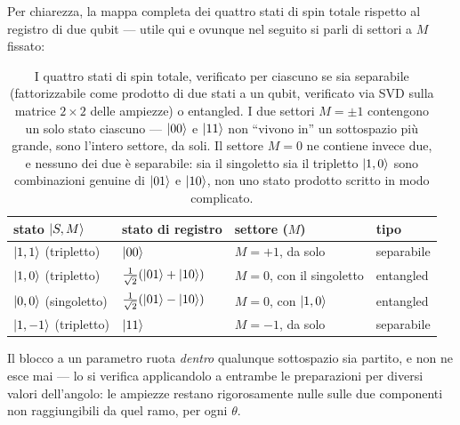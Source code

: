 \documentclass[11pt,a4paper]{article}
\begin{document}
Per chiarezza, la mappa completa dei quattro stati di spin totale rispetto
al registro di due qubit --- utile qui e ovunque nel seguito si parli di
settori a $M$ fissato:

\begin{table}[htbp]
\centering
\small
\renewcommand{\arraystretch}{1.3}
\begin{tabular}{@{}llll@{}}
\toprule
\rowcolor{grigetto}
\textbf{stato $\lvert S,M\rangle$} & \textbf{stato di registro} & \textbf{settore ($M$)} & \textbf{tipo} \\
\midrule
$\lvert 1,1\rangle$ (tripletto) & $\lvert 00\rangle$ & $M=+1$, da solo & separabile \\
$\lvert 1,0\rangle$ (tripletto) & $\tfrac{1}{\sqrt2}(\lvert 01\rangle+\lvert 10\rangle)$ & $M=0$, con il singoletto & entangled \\
$\lvert 0,0\rangle$ (singoletto) & $\tfrac{1}{\sqrt2}(\lvert 01\rangle-\lvert 10\rangle)$ & $M=0$, con $\lvert 1,0\rangle$ & entangled \\
$\lvert 1,-1\rangle$ (tripletto) & $\lvert 11\rangle$ & $M=-1$, da solo & separabile \\
\bottomrule
\end{tabular}
\caption{I quattro stati di spin totale, verificato per ciascuno se sia
separabile (fattorizzabile come prodotto di due stati a un qubit,
verificato via SVD sulla matrice $2\times2$ delle ampiezze) o entangled. I
due settori $M=\pm1$ contengono un solo stato ciascuno --- $\lvert 00\rangle$ e
$\lvert 11\rangle$ non ``vivono in'' un sottospazio più grande, sono l'intero
settore, da soli. Il settore $M=0$ ne contiene invece due, e nessuno dei
due è separabile: sia il singoletto sia il tripletto $\lvert 1,0\rangle$ sono
combinazioni genuine di $\lvert 01\rangle$ e $\lvert 10\rangle$, non uno stato prodotto
scritto in modo complicato.}
\label{tab:quattro-stati-bell}
\end{table}

Il blocco a un parametro
ruota \emph{dentro} qualunque sottospazio sia partito, e non ne esce mai --- lo
si verifica applicandolo a entrambe le preparazioni per diversi valori
dell'angolo: le ampiezze restano rigorosamente nulle sulle due componenti non
raggiungibili da quel ramo, per ogni $\theta$.
\end{document}
